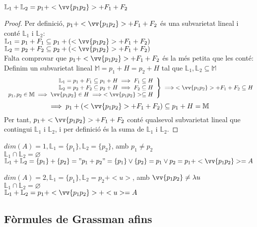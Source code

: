 \begin{prop}
	$\mathbb{L}_1+\mathbb{L}_2=p_1+<\vv{p_1p_2}>+F_1+F_2$
\end{prop}
\begin{proof}
	Per definició, $p_1+<\vv{p_1p_2}>+F_1+F_2$ és una subvarietat lineal i conté $\mathbb{L}_1$ i $\mathbb{L}_2$:\\
	$\mathbb{L}_1=p_1+F_1\subseteq p_1+(<\vv{p_1p_2}>+F_1+F_2)$\\
	$\mathbb{L}_2=p_2+F_2\subseteq p_2+(<\vv{p_1p_2}>+F_1+F_2)$\\
	Falta comprovar que $p_1+<\vv{p_1p_2}>+F_1+F_2$ és la més petita que les conté:\\
	Definim un subvarietat lineal $\mathbb{M}=p_1+H=p_2+H$ tal que $\mathbb{L}_1,\mathbb{L}_2\subseteq\mathbb{M}$\\
	\[\left.\begin{array}{r}
		\mathbb{L}_1=p_1+F_1\subseteq p_1+H\implies F_1\subseteq H                    \\
		\mathbb{L}_2=p_2+F_2\subseteq p_2+H\implies F_2\subseteq H                    \\
		p_1,p_2\in\mathbb{M}\implies\vv{p_1p_2}\in H\implies <\vv{p_1p_2}>\subseteq H \\
	\end{array}\right\}\implies <\vv{p_1p_2}>+F_1+F_2\subseteq H\]
	\[\implies p_1+(<\vv{p_1p_2}>+F_1+F_2)\subseteq p_1+H=\mathbb{M}\]
	Per tant, $p_1+<\vv{p_1p_2}>+F_1+F_2$ conté qualsevol subvarietat lineal que contingui $\mathbb{L}_1$ i $\mathbb{L}_2$, i per definició és la suma de $\mathbb{L}_1$ i $\mathbb{L}_2$.
\end{proof}

\begin{exmp}
	$dim(A)=1,\mathbb{L}_1=\{p_1\},\mathbb{L}_2=\{p_2\}$, amb $p_1\neq p_2$ \\
	$\mathbb{L}_1\cap\mathbb{L}_2=\varnothing$ \\
	$\mathbb{L}_1+\mathbb{L}_2=\{p_1\}+\{p_2\}="p_1+p_2"=\{p_1\}\lor \{p_2\}=p_1\lor p_2=p_1+<\vv{p_1p_2}>=A$
\end{exmp}
\begin{exmp}
	$dim(A)=2,\mathbb{L}_1=\{p_1\},\mathbb{L}_2=p_2+<u>$, amb $\vv{p_1p_2}\neq\lambda u$ \\
	$\mathbb{L}_1\cap\mathbb{L}_2=\varnothing$ \\
	$\mathbb{L}_1+\mathbb{L}_2=p_1+<\vv{p_1p_2}>+<u>=A$
\end{exmp}

\subsection{Fòrmules de Grassman afins}
\label{ss_frgrss}


